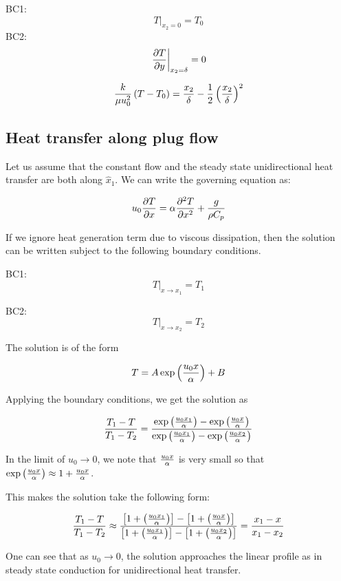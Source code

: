 BC1: $$ \left. T \right|_{x_2=0} = T_0 $$
BC2: $$ \left. {\partial T \over \partial y} \right|_{x_2=\delta} = 0 $$

$${k \over \mu u_0^2} \left( T - T_0 \right) = {x_2 \over \delta } - {1 \over 2} \left( {x_2 \over \delta} \right)^2 $$


\subsection{Heat transfer along plug flow}

Let us assume that the constant flow and the steady state unidirectional heat transfer are both along $\hat{x}_1$. We can write the governing equation as:

$$ u_0 {\partial T \over \partial x} = \alpha {\partial^2 T \over \partial x^2} + {g \over \rho C_p}$$

If we ignore heat generation term due to viscous dissipation, then the solution can be written subject to the following boundary conditions.

BC1: $$ \left. T \right|_{x \rightarrow x_1} = T_1 $$

BC2: $$ \left. T \right|_{x \rightarrow x_2} = T_2 $$

The solution is of the form 

$$ T = A \exp\left( u_0 x \over \alpha \right) + B $$

Applying the boundary conditions, we get the solution as 

$$ {T_1 - T \over T_1 - T_2} = { { \exp\left({u_0 x_1 \over \alpha}\right) - \exp\left({u_0 x \over \alpha}\right) } \over {\exp\left({u_0 x_1 \over \alpha}\right) - \exp\left({u_0 x_2 \over \alpha}\right) } }$$

In the limit of $u_0 \rightarrow 0$, we note that $u_0 x \over \alpha$ is very small so that $\exp\left( u_0 x \over \alpha \right) \approx 1 + {u_0 x \over \alpha} $. 

This makes the solution take the following form:

$$ {T_1 - T \over T_1 - T_2 } \approx { \left[ 1 + \left(u_0 x_1 \over \alpha \right) \right] - \left[ 1 + \left( u_0 x \over \alpha \right) \right]  \over \left[ 1 + \left( u_0 x_1 \over \alpha \right) \right] - \left[ 1 + \left( u_0 x_2 \over \alpha \right) \right] }   = { {x_1 - x} \over {x_1 - x_2}} $$

One can see that as $u_0 \to 0$, the solution approaches the linear profile as in steady state conduction for unidirectional heat transfer.


